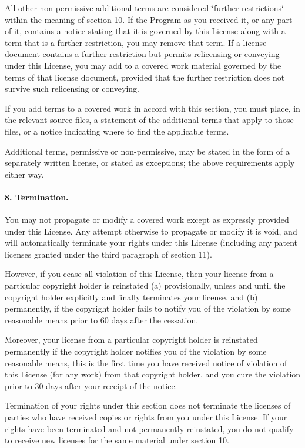 All other non-\/permissive additional terms are considered \char`\"{}further
restrictions\char`\"{} within the meaning of section 10. If the Program as you received it, or any part of it, contains a notice stating that it is governed by this License along with a term that is a further restriction, you may remove that term. If a license document contains a further restriction but permits relicensing or conveying under this License, you may add to a covered work material governed by the terms of that license document, provided that the further restriction does not survive such relicensing or conveying.

If you add terms to a covered work in accord with this section, you must place, in the relevant source files, a statement of the additional terms that apply to those files, or a notice indicating where to find the applicable terms.

Additional terms, permissive or non-\/permissive, may be stated in the form of a separately written license, or stated as exceptions; the above requirements apply either way.

\paragraph*{8. Termination.}

You may not propagate or modify a covered work except as expressly provided under this License. Any attempt otherwise to propagate or modify it is void, and will automatically terminate your rights under this License (including any patent licenses granted under the third paragraph of section 11).

However, if you cease all violation of this License, then your license from a particular copyright holder is reinstated (a) provisionally, unless and until the copyright holder explicitly and finally terminates your license, and (b) permanently, if the copyright holder fails to notify you of the violation by some reasonable means prior to 60 days after the cessation.

Moreover, your license from a particular copyright holder is reinstated permanently if the copyright holder notifies you of the violation by some reasonable means, this is the first time you have received notice of violation of this License (for any work) from that copyright holder, and you cure the violation prior to 30 days after your receipt of the notice.

Termination of your rights under this section does not terminate the licenses of parties who have received copies or rights from you under this License. If your rights have been terminated and not permanently reinstated, you do not qualify to receive new licenses for the same material under section 10.

